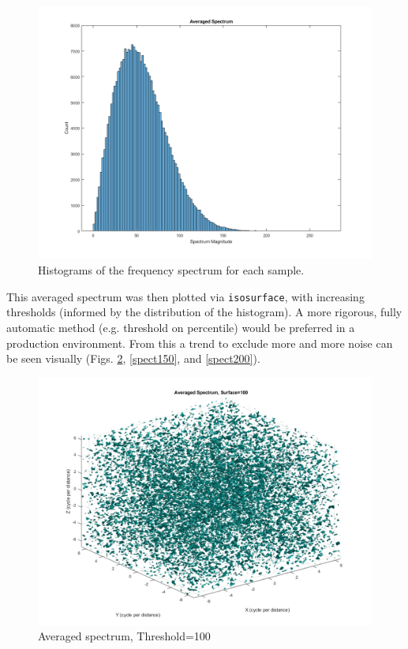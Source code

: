 \documentclass[journal]{IEEEtran}
\def\code#1{\texttt{#1}}
\begin{document}
\begin{figure}
	\centerline{\includegraphics[width=\columnwidth]{averaged_spectrum_hist.png}}
	\caption{Histograms of the frequency spectrum for each sample.}\label{avg_hist}
\end{figure}

This averaged spectrum was then plotted via \code{isosurface}, with increasing thresholds (informed by the distribution of the histogram). A more rigorous, fully automatic method (e.g. threshold on percentile) would be preferred in a production environment. From this a trend to exclude more and more noise can be seen visually (Figs. \ref{spect100}, \ref{spect150}, and \ref{spect200}).

\begin{figure}
	\centerline{\includegraphics[width=\columnwidth]{avg_spectrum_thresh100.png}}
	\caption{Averaged spectrum, Threshold=100}\label{spect100}
\end{figure}
\end{document}
